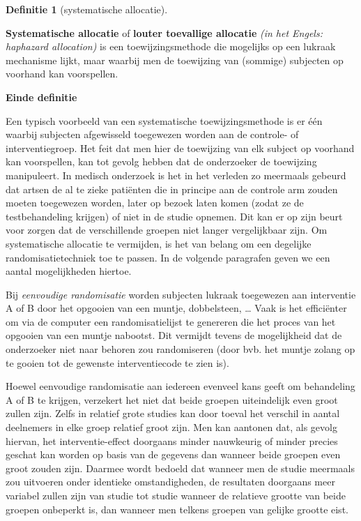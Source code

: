\documentclass[
  12pt,dutch,coursenotes]{book}
\theoremstyle{definition}
\newtheorem{definition}{Definitie}[chapter]
\theoremstyle{definition}
\theoremstyle{definition}
\theoremstyle{remark}
\begin{document}
\begin{definition}[systematische allocatie]
\protect\hypertarget{def:unnamed-chunk-70}{}{\label{def:unnamed-chunk-70} \iffalse (systematische allocatie) \fi{} }
\end{definition}
\textbf{Systematische allocatie} of \textbf{louter toevallige allocatie}
\emph{(in het Engels: haphazard allocation)} is een toewijzingsmethode die
mogelijks op een lukraak mechanisme lijkt, maar waarbij men de toewijzing
van (sommige) subjecten op voorhand kan voorspellen.

\textbf{Einde definitie}

Een typisch voorbeeld van een systematische toewijzingsmethode is er één
waarbij subjecten afgewisseld toegewezen worden aan de controle- of
interventiegroep. Het feit dat men hier de toewijzing van elk subject op voorhand kan
voorspellen, kan tot gevolg hebben dat de onderzoeker de toewijzing
manipuleert. In medisch onderzoek is het in het verleden zo meermaals gebeurd dat artsen de al te zieke patiënten die in principe aan de
controle arm zouden moeten toegewezen worden, later op bezoek laten komen
(zodat ze de testbehandeling krijgen) of niet in de studie opnemen. Dit
kan er op zijn beurt voor zorgen dat de verschillende groepen niet langer
vergelijkbaar zijn. Om systematische allocatie te vermijden, is het van
belang om een degelijke randomisatietechniek toe te passen. In de volgende
paragrafen geven we een aantal mogelijkheden hiertoe.

Bij \emph{eenvoudige randomisatie} worden subjecten lukraak toegewezen
aan interventie A of B door het opgooien van een muntje, dobbelsteen, \ldots{}
Vaak is het efficiënter om via de computer een randomisatielijst te
genereren die het proces van het opgooien van een muntje nabootst. Dit
vermijdt tevens de mogelijkheid dat de onderzoeker niet naar behoren zou
randomiseren (door bvb. het muntje zolang op te gooien tot de gewenste
interventiecode te zien is).

Hoewel eenvoudige randomisatie aan iedereen evenveel kans geeft om
behandeling A of B te krijgen, verzekert het niet dat beide groepen
uiteindelijk even groot zullen zijn. Zelfs in relatief grote studies kan
door toeval het verschil in aantal deelnemers in elke groep relatief groot
zijn. Men kan aantonen dat, als gevolg hiervan, het interventie-effect
doorgaans minder nauwkeurig of minder precies geschat kan worden op basis
van de gegevens dan wanneer beide groepen even groot zouden zijn. Daarmee
wordt bedoeld dat wanneer men de studie meermaals zou uitvoeren onder
identieke omstandigheden, de resultaten doorgaans meer variabel zullen zijn
van studie tot studie wanneer de relatieve grootte van beide groepen onbeperkt
is, dan wanneer men telkens groepen van gelijke grootte eist.
\end{document}
